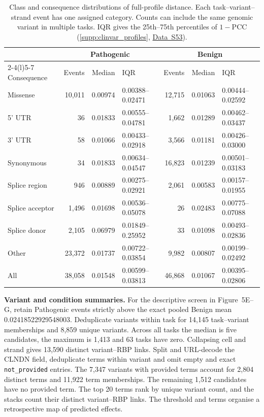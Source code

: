 \documentclass[11pt,a4paper]{article}
\newcommand{\tableid}[1]{\setcounter{table}{\numexpr#1-1\relax}}
\newcommand{\sr}[1]{\ref{#1}}
\newcommand{\data}[1]{\hyperref[data:S#1]{Data~S#1}}
\begin{document}
\tableid{25}
\begin{table}[H]\centering
\caption{Class and consequence distributions of full-profile distance. Each task--variant--strand event has one assigned category. Counts can include the same genomic variant in multiple tasks. IQR gives the 25th--75th percentiles of $1-\mathrm{PCC}$ (\sr{supp:clinvar_profiles}, \data{53}).}
\label{tab:clinvar_coverage}
\small\setlength{\tabcolsep}{4.5pt}
\begin{tabular}{@{}lrrlrrl@{}}
\toprule
& \multicolumn{3}{c}{Pathogenic} & \multicolumn{3}{c}{Benign} \\
\cmidrule(lr){2-4}\cmidrule(l){5-7}
Consequence & Events & Median & IQR & Events & Median & IQR \\
\midrule
Missense & 10,011 & 0.00974 & 0.00388--0.02471 & 12,715 & 0.01063 & 0.00444--0.02592 \\
5' UTR & 36 & 0.01833 & 0.00555--0.04781 & 1,662 & 0.01289 & 0.00462--0.03437 \\
3' UTR & 58 & 0.01066 & 0.00433--0.02918 & 3,566 & 0.01181 & 0.00426--0.03000 \\
Synonymous & 34 & 0.01833 & 0.00634--0.04547 & 16,823 & 0.01239 & 0.00501--0.03183 \\
Splice region & 946 & 0.00889 & 0.00275--0.02921 & 2,061 & 0.00583 & 0.00157--0.01955 \\
Splice acceptor & 1,496 & 0.01698 & 0.00536--0.05078 & 26 & 0.02483 & 0.00775--0.07088 \\
Splice donor & 2,105 & 0.06979 & 0.01849--0.25952 & 33 & 0.01098 & 0.00493--0.02836 \\
Other & 23,372 & 0.01737 & 0.00722--0.03854 & 9,982 & 0.00807 & 0.00199--0.02492 \\
\midrule
All & 38,058 & 0.01548 & 0.00599--0.03813 & 46,868 & 0.01067 & 0.00395--0.02806 \\

\bottomrule
\end{tabular}
\end{table}

\textbf{Variant and condition summaries.}
For the descriptive screen in Figure~5E--G, retain Pathogenic events strictly above the exact pooled Benign mean 0.02418522929548003. Deduplicate variants within task for 14,145 task--variant memberships and 8,859 unique variants. Across all tasks the median is five candidates, the maximum is 1,413 and 63 tasks have zero. Collapsing cell and strand gives 13,590 distinct variant--RBP links. Split and URL-decode the CLNDN field, deduplicate terms within variant and omit empty and exact \texttt{not\_provided} entries. The 7,347 variants with provided terms account for 2,804 distinct terms and 11,922 term memberships. The remaining 1,512 candidates have no provided term. The top 20 terms rank by unique variant count, and the stacks count their distinct variant--RBP links. The threshold and terms organise a retrospective map of predicted effects.
\end{document}
